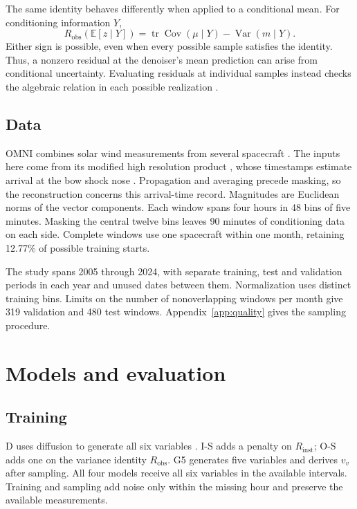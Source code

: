 \documentclass{article}
\begin{document}
The same identity behaves differently when applied to a conditional mean. For conditioning information $Y$,
\begin{equation}
 R_{\mathrm{obs}}(\mathbb{E}[z\mid Y])
 =\operatorname{tr}\operatorname{Cov}(\mu\mid Y)-\operatorname{Var}(m\mid Y).
 \label{eq:conditional}
\end{equation}
Either sign is possible, even when every possible sample satisfies the identity. Thus, a nonzero residual at the denoiser's mean prediction can arise from conditional uncertainty. Evaluating residuals at individual samples instead checks the algebraic relation in each possible realization \citep{bastek2025pidm}.

\subsection{Data}

 OMNI combines solar wind measurements from several spacecraft \citep{king2005solar}. The inputs here come from its modified high resolution product \citep{nasamodifiedomni}, whose timestamps estimate arrival at the bow shock nose \citep{papitashvili2020omni}. Propagation and averaging precede masking, so the reconstruction concerns this arrival-time record. Magnitudes are Euclidean norms of the vector components. Each window spans four hours in 48 bins of five minutes. Masking the central twelve bins leaves 90 minutes of conditioning data on each side. Complete windows use one spacecraft within one month, retaining 12.77\% of possible training starts.

The study spans 2005 through 2024, with separate training, test and validation periods in each year and unused dates between them. Normalization uses distinct training bins. Limits on the number of nonoverlapping windows per month give 319 validation and 480 test windows. Appendix~\ref{app:quality} gives the sampling procedure.

\section{Models and evaluation}

\subsection{Training}

 D uses diffusion to generate all six variables \citep{ho2020ddpm}. I-S adds a penalty on $R_{\mathrm{inst}}$; O-S adds one on the variance identity $R_{\mathrm{obs}}$. G5 generates five variables and derives $v_v$ after sampling. All four models receive all six variables in the available intervals. Training and sampling add noise only within the missing hour and preserve the available measurements.
\end{document}
